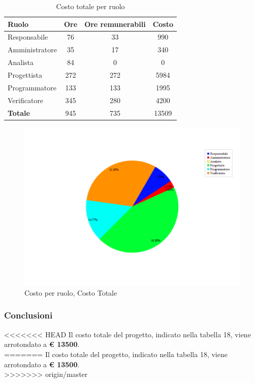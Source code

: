 \begin{table}[H]
	\begin{center}
		\begin{tabular}{|l|c|c|c|}
			\hline
			\textbf{Ruolo}	& \textbf{Ore} &	\textbf{Ore remunerabili}	 &\textbf{Costo} \\
			\hline
			Responsabile	&	76	&	33	&	990	\\
			\hline
			Amministratore	&	35	&	17	&	340	\\
			\hline
			Analista		&	84	&	0	&	0	\\
			\hline
			Progettista		&	272	&	272	&	5984	\\
			\hline
			Programmatore	&	133	&	133	&	1995	\\
			\hline
			Verificatore	&	345	&	280	&	4200	\\
			\hline
			\textbf{Totale}	&	945	&	735	&	13509	\\
			\hline
		\end{tabular}
	\end{center}
	\caption{Costo totale per ruolo}
\end{table}

\begin{figure}[H]
	\centering
	\includegraphics[scale=0.4]{immagini/Grafi/CostoTot}
	\caption{Costo per ruolo, Costo Totale}
\end{figure}

\subsubsection{Conclusioni}
<<<<<<< HEAD
Il costo totale del progetto, indicato nella tabella 18, viene arrotondato a \textbf{€ 13500}.\\
=======
Il costo totale del progetto, indicato nella tabella 18, viene arrotondato a \textbf{€ 13500}.\\
>>>>>>> origin/master
